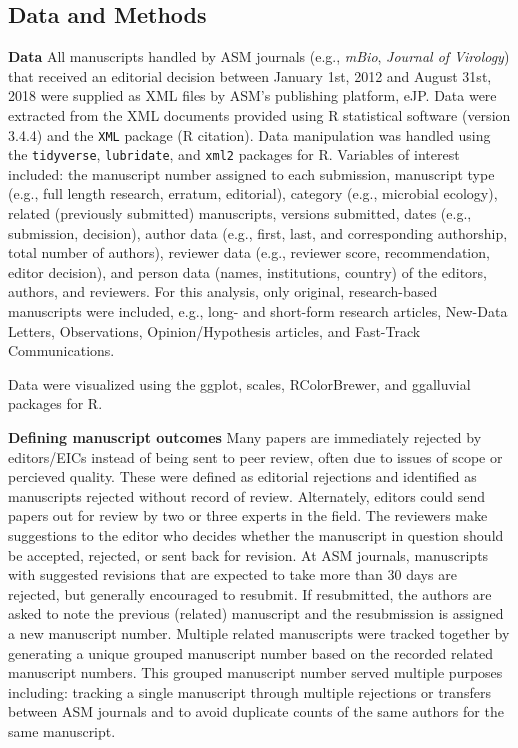 \documentclass[11pt,]{article}
\begin{document}
\subsection{Data and Methods}\label{data-and-methods}

\textbf{Data} All manuscripts handled by ASM journals (e.g.,
\emph{mBio}, \emph{Journal of Virology}) that received an editorial
decision between January 1st, 2012 and August 31st, 2018 were supplied
as XML files by ASM's publishing platform, eJP. Data were extracted from
the XML documents provided using R statistical software (version 3.4.4)
and the \texttt{XML} package (R citation). Data manipulation was handled
using the \texttt{tidyverse}, \texttt{lubridate}, and \texttt{xml2}
packages for R. Variables of interest included: the manuscript number
assigned to each submission, manuscript type (e.g., full length
research, erratum, editorial), category (e.g., microbial ecology),
related (previously submitted) manuscripts, versions submitted, dates
(e.g., submission, decision), author data (e.g., first, last, and
corresponding authorship, total number of authors), reviewer data (e.g.,
reviewer score, recommendation, editor decision), and person data
(names, institutions, country) of the editors, authors, and reviewers.
For this analysis, only original, research-based manuscripts were
included, e.g., long- and short-form research articles, New-Data
Letters, Observations, Opinion/Hypothesis articles, and Fast-Track
Communications.

Data were visualized using the ggplot, scales, RColorBrewer, and
ggalluvial packages for R.

\textbf{Defining manuscript outcomes} Many papers are immediately
rejected by editors/EICs instead of being sent to peer review, often due
to issues of scope or percieved quality. These were defined as editorial
rejections and identified as manuscripts rejected without record of
review. Alternately, editors could send papers out for review by two or
three experts in the field. The reviewers make suggestions to the editor
who decides whether the manuscript in question should be accepted,
rejected, or sent back for revision. At ASM journals, manuscripts with
suggested revisions that are expected to take more than 30 days are
rejected, but generally encouraged to resubmit. If resubmitted, the
authors are asked to note the previous (related) manuscript and the
resubmission is assigned a new manuscript number. Multiple related
manuscripts were tracked together by generating a unique grouped
manuscript number based on the recorded related manuscript numbers. This
grouped manuscript number served multiple purposes including: tracking a
single manuscript through multiple rejections or transfers between ASM
journals and to avoid duplicate counts of the same authors for the same
manuscript.
\end{document}
